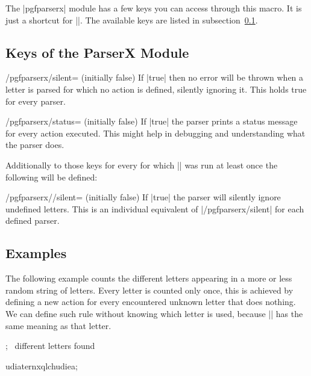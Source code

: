 \begin{command}{\pgfparserxset{}}
  The |pgfparserx| module has a few keys you can access through this macro. It
  is just a shortcut for ||. The available keys are
  listed in subsection~\ref{sec:parserx:keys}.
\end{command}

\subsection{Keys of the ParserX Module}\label{sec:parserx:keys}
\begin{key}{/pgfparserx/silent= (initially false)}
  If |true| then no error will be thrown when a letter is parsed for which no
  action is defined, silently ignoring it. This holds true for every parser.
\end{key}

\begin{key}{/pgfparserx/status= (initially false)}
  If |true| the parser prints a status message for every action executed. This
  might help in debugging and understanding what the parser does.
\end{key}

Additionally to those keys for every  for which
|\pgfparserxdef| was run at least once the following will be defined:

\begin{key}
  {/pgfparserx//silent= (initially false)}
  If |true| the parser  will silently ignore undefined
  letters. This is an individual equivalent of |/pgfparserx/silent| for each
  defined parser.
\end{key}

\subsection{Examples}
The following example counts the different letters appearing in a more or less
random string of letters. Every letter is counted only once, this is achieved by
defining a new action for every encountered unknown letter that does nothing. We
can define such rule without knowing which letter is used, because
|\pgfparserxtoken| has the same meaning as that letter.
\begin{codeexample}[]
\newcount\mycountx
;{}
  {\pgfparserxtoken{}\advance{}}
  {\the\mycountx\ different letters found}

udiaternxqlchudiea;
\end{codeexample}

